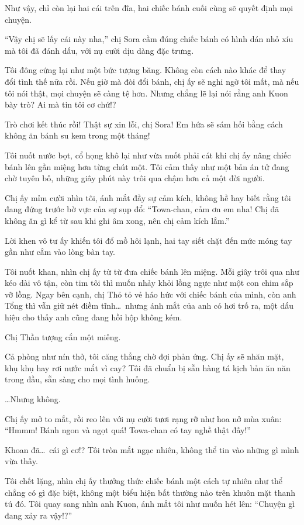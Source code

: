 \documentclass[../main.tex]{subfiles}
\begin{document}
Như vậy, chỉ còn lại hai cái trên đĩa, hai chiếc bánh cuối cùng sẽ quyết định mọi chuyện.

``Vậy chị sẽ lấy cái này nha,'' chị Sora cầm đúng chiếc bánh có hình dán nhỏ xíu mà tôi đã đánh dấu, với nụ cười dịu dàng đặc trưng.

Tôi đông cứng lại như một bức tượng băng. Không còn cách nào khác để thay đổi tình thế nữa rồi. Nếu giờ mà đòi đổi bánh, chị ấy sẽ nghi ngờ tôi mất, mà nếu tôi nói thật, mọi chuyện sẽ càng tệ hơn. Nhưng chẳng lẽ lại nói rằng anh Kuon bày trò? Ai mà tin tôi cơ chứ!?

Trò chơi kết thúc rồi! Thật sự xin lỗi, chị Sora! Em hứa sẽ sám hối bằng cách không ăn bánh su kem trong một tháng!

Tôi nuốt nước bọt, cổ họng khô lại như vừa nuốt phải cát khi chị ấy nâng chiếc bánh lên gần miệng hơn từng chút một. Tôi cảm thấy như một bản án tử đang chờ tuyên bố, những giây phút này trôi qua chậm hơn cả một đời người.

Chị ấy mỉm cười nhìn tôi, ánh mắt đầy sự cảm kích, không hề hay biết rằng tôi đang đứng trước bờ vực của sự sụp đổ: ``Towa-chan, cảm ơn em nha! Chị đã không ăn gì kể từ sau khi ghi âm xong, nên chị cảm kích lắm.''

Lời khen vô tư ấy khiến tôi đổ mồ hôi lạnh, hai tay siết chặt đến mức móng tay gần như cắm vào lòng bàn tay.


Tôi nuốt khan, nhìn chị ấy từ từ đưa chiếc bánh lên miệng. Mỗi giây trôi qua như kéo dài vô tận, còn tim tôi thì muốn nhảy khỏi lồng ngực như một con chim sắp vỡ lồng. Ngay bên cạnh, chị Thỏ tỏ vẻ háo hức với chiếc bánh của mình, còn anh Tổng thì vẫn giữ nét điềm tĩnh\dots\ nhưng ánh mắt của anh có hơi trố ra, một dấu hiệu cho thấy anh cũng đang hồi hộp không kém.

Chị Thần tượng cắn một miếng.

Cả phòng như nín thở, tôi căng thẳng chờ đợi phản ứng. Chị ấy sẽ nhăn mặt, khụ khụ hay rơi nước mắt vì cay? Tôi đã chuẩn bị sẵn hàng tá kịch bản ăn năn trong đầu, sẵn sàng cho mọi tình huống.

\dots Nhưng không.

Chị ấy mở to mắt, rồi reo lên với nụ cười tươi rạng rỡ như hoa nở mùa xuân: ``Hmmm! Bánh ngon và ngọt quá! Towa-chan có tay nghề thật đấy!''

Khoan đã\dots\ cái gì cơ!? Tôi tròn mắt ngạc nhiên, không thể tin vào những gì mình vừa thấy.

Tôi chết lặng, nhìn chị ấy thưởng thức chiếc bánh một cách tự nhiên như thể chẳng có gì đặc biệt, không một biểu hiện bất thường nào trên khuôn mặt thanh tú đó. Tôi quay sang nhìn anh Kuon, ánh mắt tôi như muốn hét lên: ``Chuyện gì đang xảy ra vậy!?''
\end{document}
